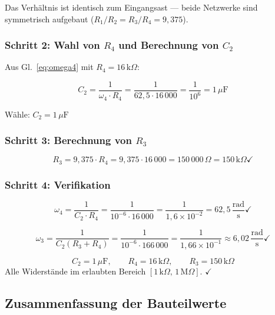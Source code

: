 \documentclass[12pt,a4paper]{article}
\begin{document}
Das Verhältnis ist identisch zum Eingangsast --- beide Netzwerke sind
symmetrisch aufgebaut ($R_1/R_2 = R_3/R_4 = 9{,}375$).

\subsubsection*{Schritt 2: Wahl von $R_4$ und Berechnung von $C_2$}

Aus Gl.~\eqref{eq:omega4} mit $R_4 = 16\,\text{k}\Omega$:

\[
  C_2 = \frac{1}{\omega_4 \cdot R_4}
      = \frac{1}{62{,}5 \cdot 16\,000}
      = \frac{1}{10^{6}}
      = 1\,\mu\text{F}
\]

Wähle: $\boxed{C_2 = 1\,\mu\text{F}}$

\subsubsection*{Schritt 3: Berechnung von $R_3$}

\[
  R_3 = 9{,}375 \cdot R_4 = 9{,}375 \cdot 16\,000 = 150\,000\,\Omega
  = 150\,\text{k}\Omega \checkmark
\]

\subsubsection*{Schritt 4: Verifikation}

\[
  \omega_4 = \frac{1}{C_2 \cdot R_4}
           = \frac{1}{10^{-6} \cdot 16\,000}
           = \frac{1}{1{,}6 \times 10^{-2}}
           = 62{,}5\,\frac{\text{rad}}{\text{s}} \checkmark
\]

\[
  \omega_3 = \frac{1}{C_2(R_3+R_4)}
           = \frac{1}{10^{-6} \cdot 166\,000}
           = \frac{1}{1{,}66 \times 10^{-1}}
           \approx 6{,}02\,\frac{\text{rad}}{\text{s}} \checkmark
\]

\begin{tcolorbox}[ergebnis, title={Ergebnis f\"{u}r $C_2$, $R_3$, $R_4$}]
\[
  C_2 = 1\,\mu\text{F}, \qquad R_4 = 16\,\text{k}\Omega, \qquad R_3 = 150\,\text{k}\Omega
\]
Alle Widerstände im erlaubten Bereich $[1\,\text{k}\Omega,\,1\,\text{M}\Omega]$. $\checkmark$
\end{tcolorbox}

\subsection{Zusammenfassung der Bauteilwerte}
\end{document}
